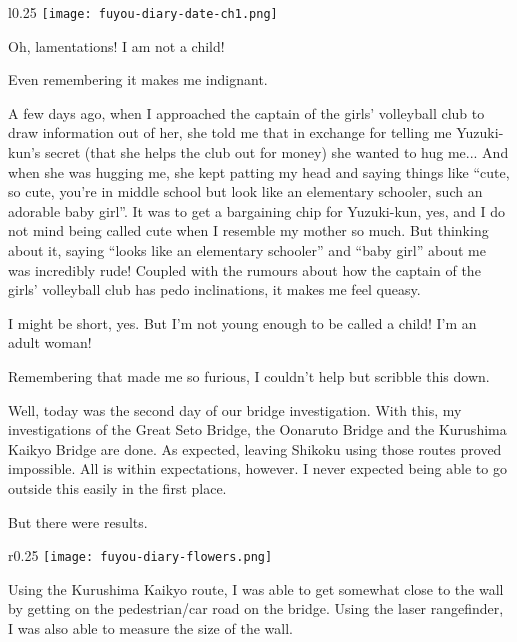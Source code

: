 \newpage
\begin{center}
\begin{graphpaperBox}[enhanced,box align=center,colframe=diaryborder,width=0.8\textwidth]
\begin{wrapfigure}{l}{0.25\textwidth}
\hspace*{-5mm}\texttt{[image: fuyou-diary-date-ch1.png]}
\end{wrapfigure}

Oh, lamentations! I am not a child!

Even remembering it makes me indignant.

A few days ago, when I approached the captain of the girls' volleyball club to draw information out of her, she told me that in exchange for telling me Yuzuki-kun's secret (that she helps the club out for money) she wanted to hug me... And when she was hugging me, she kept patting my head and saying things like ``cute, so cute, you're in middle school but look like an elementary schooler, such an adorable baby girl''. It was to get a bargaining chip for Yuzuki-kun, yes, and I do not mind being called cute when I resemble my mother so much. But thinking about it, saying ``looks like an elementary schooler'' and ``baby girl'' about me was incredibly rude! Coupled with the rumours about how the captain of the girls' volleyball club has pedo inclinations, it makes me feel queasy.

I might be short, yes. But I'm not young enough to be called a child! I'm an adult woman!

Remembering that made me so furious, I couldn't help but scribble this down.

Well, today was the second day of our bridge investigation. With this, my investigations of the Great Seto Bridge, the Oonaruto Bridge and the Kurushima Kaikyo Bridge are done. As expected, leaving Shikoku using those routes proved impossible. All is within expectations, however. I never expected being able to go outside this easily in the first place.

But there were results.

\begin{wrapfigure}{r}{0.25\textwidth}
\texttt{[image: fuyou-diary-flowers.png]}
\end{wrapfigure}

Using the Kurushima Kaikyo route, I was able to get somewhat close to the wall by getting on the pedestrian/car road on the bridge. Using the laser rangefinder, I was also able to measure the size of the wall.


\end{graphpaperBox}
\end{center}
